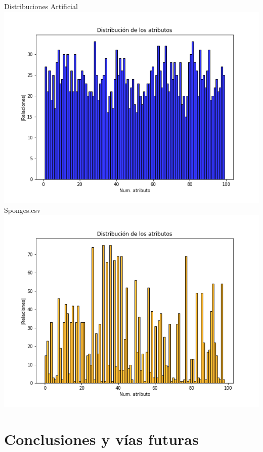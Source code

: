 \documentclass{beamer}
\begin{document}
      \begin{frame}{Distribuciones}
        \hspace{-7.mm}
      \centering
      Artificial
      \includegraphics[scale=0.3]{images/distribution-artificialg30G80.png}
      \endminipage
      \hspace{3mm}
      \centering
      Sponges.csv
      \includegraphics[scale=0.3]{images/distribution-sponges.png}
      \endminipage
  \end{frame}


\section{Conclusiones y vías futuras}
\end{document}
